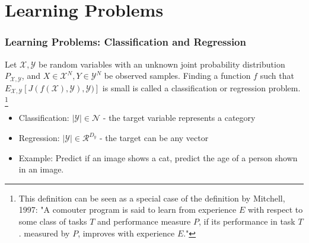 \section{Learning Problems} %

\begin{frame}
\frametitle{Learning Problems: Classification and Regression}

\begin{definition}
    Let $\mathcal{X}, \mathcal{Y}$ be random variables with an unknown joint probability distribution $P_{\mathcal{X}, \mathcal{Y}}$, and $X \in \mathcal{X}^N, Y \in \mathcal{Y}^N$ be observed samples. Finding a function $f$ such that $E_{\mathcal{X}, \mathcal{Y}}[J(f(\mathcal{X}), \mathcal{Y}), \mathcal{Y})]$ is small is called a classification or regression problem. \footnote{
        This definition can be seen as a special case of the definition by Mitchell, 1997: "A comouter program is said to learn from experience $E$ with respect to some class of tasks $T$ and performance measure $P$, if its performance in task $T$. measured by $P$, improves with experience $E$."
    }
\end{definition}

\begin{itemize}
    \item Classification: $|\mathcal{Y}| \in \mathcal{N}$ - the target variable represents a category
    \item Regression: $|\mathcal{Y}| \in \mathcal{R}^{D_y}$ - the target can be any vector
    \item Example: Predict if an image shows a cat, predict the age of a person shown in an image.
\end{itemize}


\end{frame}
